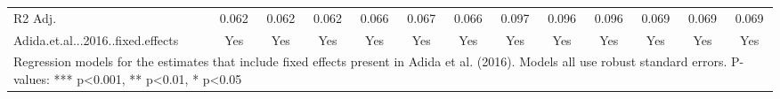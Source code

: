 \begin{table}
\begin{tabular}[t]{lcccccccccccc}
R2 Adj. & \num{0.062} & \num{0.062} & \num{0.062} & \num{0.066} & \num{0.067} & \num{0.066} & \num{0.097} & \num{0.096} & \num{0.096} & \num{0.069} & \num{0.069} & \num{0.069}\\
Adida.et.al...2016..fixed.effects & Yes & Yes & Yes & Yes & Yes & Yes & Yes & Yes & Yes & Yes & Yes & Yes\\
\bottomrule
\multicolumn{13}{l}{\rule{0pt}{1em}Regression models for the estimates that include fixed effects present in Adida et al. (2016). Models all use robust standard errors. P-values: *** p<0.001, ** p<0.01, * p<0.05}\\
\end{tabular}
\end{table}
